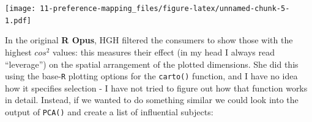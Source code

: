 \documentclass[
]{book}
\newenvironment{Shaded}{\begin{snugshade}}{\end{snugshade}}
\newcommand{\AttributeTok}[1]{\textcolor[rgb]{0.13,0.29,0.53}{#1}}
\newcommand{\CommentTok}[1]{\textcolor[rgb]{0.56,0.35,0.01}{\textit{#1}}}
\newcommand{\FloatTok}[1]{\textcolor[rgb]{0.00,0.00,0.81}{#1}}
\newcommand{\FunctionTok}[1]{\textcolor[rgb]{0.13,0.29,0.53}{\textbf{#1}}}
\newcommand{\NormalTok}[1]{#1}
\newcommand{\OtherTok}[1]{\textcolor[rgb]{0.56,0.35,0.01}{#1}}
\newcommand{\SpecialCharTok}[1]{\textcolor[rgb]{0.81,0.36,0.00}{\textbf{#1}}}
\newcommand{\StringTok}[1]{\textcolor[rgb]{0.31,0.60,0.02}{#1}}
\begin{document}
\texttt{[image: 11-preference-mapping\_files/figure-latex/unnamed-chunk-5-1.pdf]}

In the original \textbf{R Opus}, HGH filtered the consumers to show those with the highest \(cos^2\) values: this measures their effect (in my head I always read ``leverage'') on the spatial arrangement of the plotted dimensions. She did this using the base-\texttt{R} plotting options for the \texttt{carto()} function, and I have no idea how it specifies selection - I have not tried to figure out how that function works in detail. Instead, if we wanted to do something similar we could look into the output of \texttt{PCA()} and create a list of influential subjects:

\begin{Shaded}
\end{Shaded}
\end{document}
